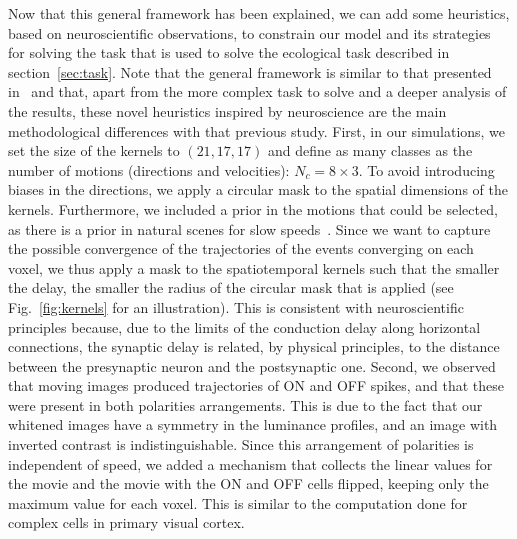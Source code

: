 \documentclass[default]{sn-jnl}%
\theoremstyle{thmstyleone}%
\theoremstyle{thmstyletwo}%
\theoremstyle{thmstylethree}%
\newcommand{\seeFig}[1]{see Fig.~\ref{fig:#1}}%
\newcommand{\class}{c} %
\begin{document}
Now that this general framework has been explained, we can add some heuristics, based on neuroscientific observations, to constrain our model and its strategies for solving the task that is used to solve the ecological task described in section~\ref{sec:task}. Note that the general framework is similar to that presented in~\cite{grimaldi_learning_2022} and that, apart from the more complex task to solve and a deeper analysis of the results, these novel heuristics inspired by neuroscience are the main methodological differences with that previous study. First, in our simulations, we set the size of the kernels to $(21, 17, 17)$ and define as many classes as the number of motions (directions and velocities): $N_\class = 8 \times 3$. To avoid introducing biases in the directions, we apply a circular mask to the spatial dimensions of the kernels. Furthermore, we included a prior in the motions that could be selected, as there is a prior in natural scenes for slow speeds~\citep{vacher_bayesian_2018}. Since we want to capture the possible convergence of the trajectories of the events converging on each voxel, we thus apply a mask to the spatiotemporal kernels such that the smaller the delay, the smaller the radius of the circular mask that is applied (\seeFig{kernels} for an illustration). This is consistent with neuroscientific principles because, due to the limits of the conduction delay along horizontal connections, the synaptic delay is related, by physical principles, to the distance between the presynaptic neuron and the postsynaptic one. Second, we observed that moving images produced trajectories of ON and OFF spikes, and that these were present in both polarities arrangements. This is due to the fact that our whitened images have a symmetry in the luminance profiles, and an image with inverted contrast is indistinguishable. Since this arrangement of polarities is independent of speed, we added a mechanism that collects the linear values for the movie and the movie with the ON and OFF cells flipped, keeping only the maximum value for each voxel. This is similar to the computation done for complex cells in primary visual cortex.
\end{document}
